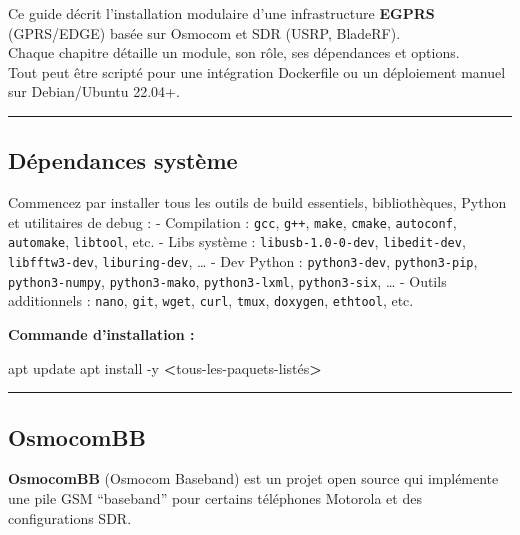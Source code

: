 \documentclass[
]{article}
\newenvironment{Shaded}{\begin{snugshade}}{\end{snugshade}}
\newcommand{\AttributeTok}[1]{\textcolor[rgb]{0.13,0.29,0.53}{#1}}
\newcommand{\ExtensionTok}[1]{#1}
\newcommand{\NormalTok}[1]{#1}
\newcommand{\OperatorTok}[1]{\textcolor[rgb]{0.81,0.36,0.00}{\textbf{#1}}}
\begin{document}
Ce guide décrit l'installation modulaire d'une infrastructure
\textbf{EGPRS} (GPRS/EDGE) basée sur Osmocom et SDR (USRP, BladeRF).\\
Chaque chapitre détaille un module, son rôle, ses dépendances et
options.\\
Tout peut être scripté pour une intégration Dockerfile ou un déploiement
manuel sur Debian/Ubuntu 22.04+.

\begin{center}\rule{0.5\linewidth}{0.5pt}\end{center}

\subsection{Dépendances système}\label{duxe9pendances-systuxe8me}

Commencez par installer tous les outils de build essentiels,
bibliothèques, Python et utilitaires de debug : - Compilation :
\texttt{gcc}, \texttt{g++}, \texttt{make}, \texttt{cmake},
\texttt{autoconf}, \texttt{automake}, \texttt{libtool}, etc. - Libs
système : \texttt{libusb-1.0-0-dev}, \texttt{libedit-dev},
\texttt{libfftw3-dev}, \texttt{liburing-dev}, \ldots{} - Dev Python :
\texttt{python3-dev}, \texttt{python3-pip}, \texttt{python3-numpy},
\texttt{python3-mako}, \texttt{python3-lxml}, \texttt{python3-six},
\ldots{} - Outils additionnels : \texttt{nano}, \texttt{git},
\texttt{wget}, \texttt{curl}, \texttt{tmux}, \texttt{doxygen},
\texttt{ethtool}, etc.

\textbf{Commande d'installation :}

\begin{Shaded}
\begin{Highlighting}[]
\ExtensionTok{apt}\NormalTok{ update}
\ExtensionTok{apt}\NormalTok{ install }\AttributeTok{{-}y} \OperatorTok{\textless{}}\NormalTok{tous{-}les{-}paquets{-}listés}\OperatorTok{\textgreater{}}
\end{Highlighting}
\end{Shaded}

\begin{center}\rule{0.5\linewidth}{0.5pt}\end{center}

\subsection{OsmocomBB}\label{osmocombb}

\textbf{OsmocomBB} (Osmocom Baseband) est un projet open source qui
implémente une pile GSM ``baseband'' pour certains téléphones Motorola
et des configurations SDR.
\end{document}
